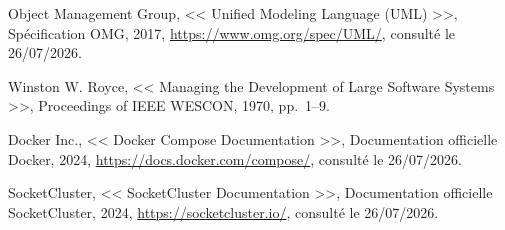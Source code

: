 \documentclass[12pt,a4paper]{report}
\numberwithin{figure}{chapter}
\numberwithin{table}{chapter}
\begin{document}
\begin{enumerate}[leftmargin=2em,itemsep=6pt,label={[\arabic*]}]
\item Object Management Group, << Unified Modeling Language (UML) >>, Spécification OMG, 2017, \url{https://www.omg.org/spec/UML/}, consulté le 26/07/2026.

\item Winston W. Royce, << Managing the Development of Large Software Systems >>, Proceedings of IEEE WESCON, 1970, pp.~1--9.

\item Docker Inc., << Docker Compose Documentation >>, Documentation officielle Docker, 2024, \url{https://docs.docker.com/compose/}, consulté le 26/07/2026.

\item SocketCluster, << SocketCluster Documentation >>, Documentation officielle SocketCluster, 2024, \url{https://socketcluster.io/}, consulté le 26/07/2026.
\end{enumerate}
\end{document}
